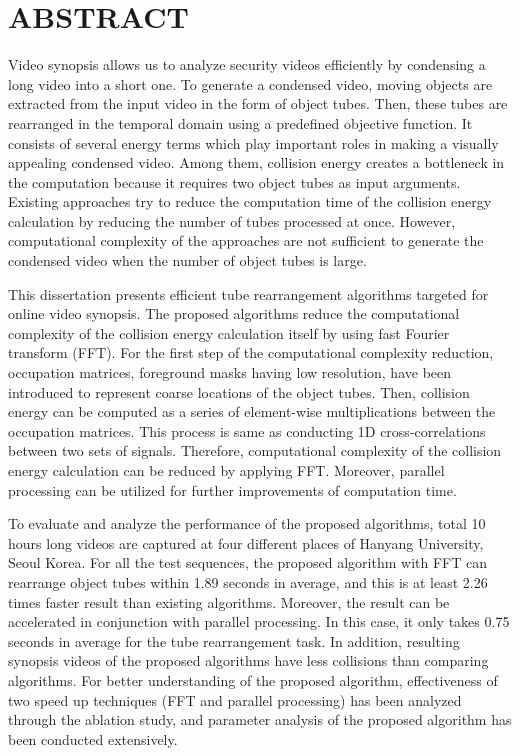 \documentclass[11pt]{hyu_thesis}
\begin{document}


\restoregeometry
\frontmatter

\tableofcontents
\newpage
\listoffigures
\newpage
\listoftables
\newpage

\mainmatter

\chapter*{ABSTRACT}

Video synopsis allows us to analyze security videos efficiently by condensing a long video into a short one. To generate a condensed video, moving objects are extracted from the input video in the form of object tubes. Then, these tubes are rearranged in the temporal domain using a predefined objective function. It consists of several energy terms which play important roles in making a visually appealing condensed video. Among them, collision energy creates a bottleneck in the computation because it requires two object tubes as input arguments. Existing approaches try to reduce the computation time of the collision energy calculation by reducing the number of tubes processed at once. However, computational complexity of the approaches are not sufficient to generate the condensed video when the number of object tubes is large.

This dissertation presents efficient tube rearrangement algorithms targeted for online video synopsis. The proposed algorithms reduce the computational complexity of the collision energy calculation itself by using fast Fourier transform (FFT). For the first step of the computational complexity reduction, occupation matrices, foreground masks having low resolution, have been introduced to represent coarse locations of the object tubes. Then, collision energy can be computed as a series of element-wise multiplications between the occupation matrices. This process is same as conducting 1D cross-correlations between two sets of signals. Therefore, computational complexity of the collision energy calculation can be reduced by applying FFT. Moreover, parallel processing can be utilized for further improvements of computation time.

To evaluate and analyze the performance of the proposed algorithms, total 10 hours long videos are captured at four different places of Hanyang University, Seoul Korea. For all the test sequences, the proposed algorithm with FFT can rearrange object tubes within 1.89 seconds in average, and this is at least 2.26 times faster result than existing algorithms. Moreover, the result can be accelerated in conjunction with parallel processing. In this case, it only takes 0.75 seconds in average for the tube rearrangement task. In addition, resulting synopsis videos of the proposed algorithms have less collisions than comparing algorithms. For better understanding of the proposed algorithm, effectiveness of two speed up techniques (FFT and parallel processing) has been analyzed through the ablation study, and parameter analysis of the proposed algorithm has been conducted extensively.
\newpage
\end{document}
